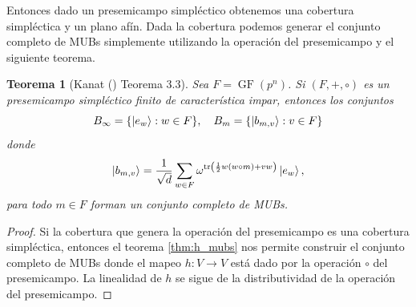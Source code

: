 \documentclass[a4paper,11pt]{report}
\DeclareMathOperator{\tr}{tr}
\DeclareMathOperator{\GF}{GF}
\newtheorem{theorem}{Teorema}
\begin{document}
  
  Entonces dado un presemicampo simpléctico obtenemos una
  cobertura simpléctica y un plano afín. Dada la cobertura
  podemos generar el conjunto completo de MUBs simplemente
  utilizando la operación del presemicampo y el siguiente
  teorema.
  \begin{theorem}[Kanat (\cite{abdukhalikov2015}) Teorema 3.3]
    \label{thm:kanat_presemi_mubs}
    Sea $F = \GF(p^{n})$. Si $(F, +, \circ)$ es un
    presemicampo simpléctico finito de característica impar,
    entonces los conjuntos
    \begin{equation}
      B_\infty = \{\ket{e_w} : w \in F\},
      \quad
      B_m = \{\ket{b_{m,v}} : v \in F\}
    \end{equation}
    donde 
    \begin{equation}
      \label{eqn:kanat_presemi_mubs}
      \ket{b_{m,v}}
      = \frac{1}{\sqrt{d}} \sum_{w \in F}^{}
      \omega^{\tr\left(
          \frac{1}{2} w (w \circ m) + v w
      \right) } \ket{e_w},
    \end{equation} 
    para todo $m \in F$ forman un conjunto completo de MUBs.
  \end{theorem}
  \begin{proof}
    Si la cobertura que genera la operación del presemicampo
    es una cobertura simpléctica, entonces el teorema
    \ref{thm:h_mubs} nos permite construir el conjunto
    completo de MUBs donde el mapeo $h : V \to V$ está dado
    por la operación $\circ$ del presemicampo. La linealidad
    de $h$ se sigue de la distributividad de la operación
    del presemicampo.
  \end{proof}
\end{document}
